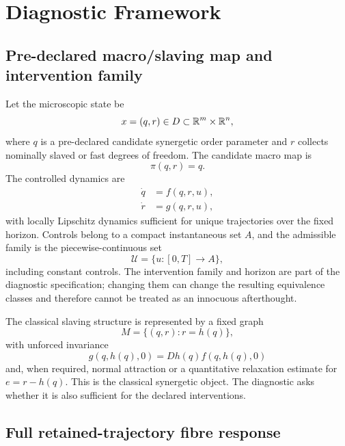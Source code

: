 \section{Diagnostic Framework}

\subsection{Pre-declared macro/slaving map and intervention family}

Let the microscopic state be
\begin{equation}
x=(q,r)\in D\subset\mathbb{R}^m\times\mathbb{R}^n,
\end{equation}
where $q$ is a pre-declared candidate synergetic order parameter and $r$ collects nominally slaved or fast degrees of freedom. The candidate macro map is
\begin{equation}
\pi(q,r)=q.
\end{equation}
The controlled dynamics are
\begin{align}
\dot q &= f(q,r,u),\\
\dot r &= g(q,r,u),
\end{align}
with locally Lipschitz dynamics sufficient for unique trajectories over the fixed horizon. Controls belong to a compact instantaneous set $A$, and the admissible family is the piecewise-continuous set
\begin{equation}
\mathcal U=\{u:[0,T]\to A\},
\end{equation}
including constant controls. The intervention family and horizon are part of the diagnostic specification; changing them can change the resulting equivalence classes and therefore cannot be treated as an innocuous afterthought.

The classical slaving structure is represented by a fixed graph
\begin{equation}
M=\{(q,r):r=h(q)\},
\end{equation}
with unforced invariance
\begin{equation}
g(q,h(q),0)=Dh(q)f(q,h(q),0)
\end{equation}
and, when required, normal attraction or a quantitative relaxation estimate for $e=r-h(q)$. This is the classical synergetic object.\cite{Haken1996} The diagnostic asks whether it is also sufficient for the declared interventions.

\subsection{Full retained-trajectory fibre response}

